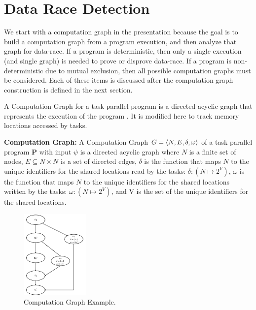 \section{Data Race Detection} \label{sec:drd}
We start with a computation graph in the presentation because the goal is to build a computation graph from a program execution, and then analyze that graph for data-race. If a program is deterministic, then only a single execution (and single graph) is needed to prove or disprove data-race. If a program is non-deterministic due to mutual exclusion, then all possible computation graphs must be considered. Each of these items is discussed after the computation graph construction is defined in the next section. 

A Computation Graph for a task parallel program is a directed acyclic graph that represents the execution of the program \cite{dennis2012determinacy}. It is modified here to track memory locations accessed by tasks. 

\begin{definition}
\textbf{Computation Graph:} A Computation Graph 
$G = \langle N, E, \delta, \omega \rangle $ of a task parallel program \textbf{P} with input $\psi$ is a directed acyclic graph where $N$ is a finite set of nodes, $E \subseteq N \times N$ is a set of directed edges, $\delta$ is the function that maps $N$ to the unique identifiers for the shared locations read by the tasks: $\delta : (N \mapsto 2^{V})$, $\omega$ is the function that maps $N$ to the unique identifiers for the shared locations written by the tasks: $\omega : (N \mapsto 2^{V})$, and V is the set of the unique identifiers for the shared locations.
\end{definition}



\begin{figure}
  \centering
        \includegraphics[width=0.3\textwidth]{../figs/Fig3-1.pdf}
    \caption{Computation Graph Example.}
    \label{fig:cg}
    \vspace{-1em}
\end{figure}

